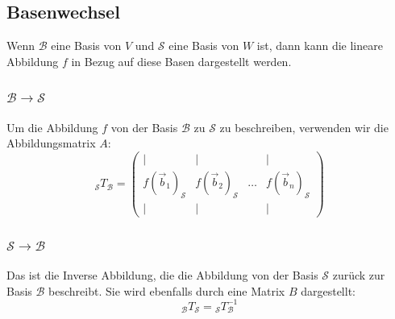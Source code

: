 \documentclass{article}
\begin{document}
\begin{minipage}[t]{0.45\textwidth}
    \subsection*{Basenwechsel}
    Wenn \( \mathcal{B} \) eine Basis von \( V \) und \( \mathcal{S} \) eine Basis von \( W \) ist, dann kann die lineare Abbildung \( f \) in Bezug auf diese Basen dargestellt werden.

    \subsubsection*{$\mathcal{B} \to \mathcal{S}$}
    Um die Abbildung \( f \) von der Basis \( \mathcal{B} \) zu \( \mathcal{S} \) zu beschreiben, verwenden wir die Abbildungsmatrix \( A \):
    \begin{equation*}
        {}_{\mathcal{S}}T_{\mathcal{B}} = \begin{pmatrix}
            | & | & & | \\
            f(\vec{b}_1)_{\mathcal{S}} & f(\vec{b}_2)_{\mathcal{S}} & \ldots & f(\vec{b}_n)_{\mathcal{S}} \\
            | & | & & |
        \end{pmatrix}
    \end{equation*}

    \subsubsection*{$\mathcal{S} \to \mathcal{B}$}
    Das ist die Inverse Abbildung, die die Abbildung von der Basis \( \mathcal{S} \) zurück zur Basis \( \mathcal{B} \) beschreibt. Sie wird ebenfalls durch eine Matrix \( B \) dargestellt:
    \begin{equation*}
        {}_{\mathcal{B}}T_{\mathcal{S}} = {}_{\mathcal{S}}T_{\mathcal{B}}^{-1}
    \end{equation*}

\end{minipage}
\hfill
\end{document}

